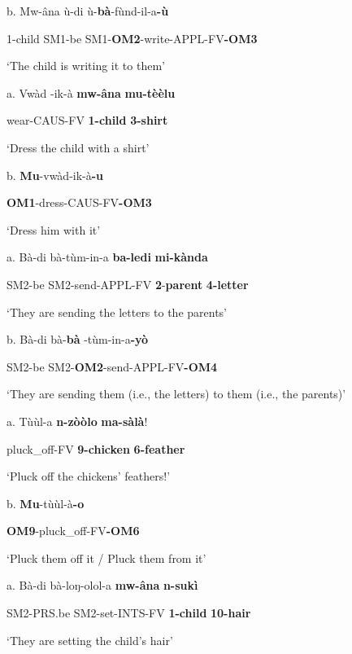 \documentclass[output=paper]{langscibook}
\begin{document}
b.  Mw-âna    ù-di      ù-\textbf{bà}{}-fùnd-il-a\textbf{{}-ù}

1-child    SM1-be    SM1-\textbf{OM2}{}-write-APPL-FV\textbf{{}-OM3}

\glt ‘The child is writing it to them’

\ea%
    \label{ex:lukusa:56}
    \z

          a.  Vwàd  {}-ik-à      \textbf{mw-âna}    \textbf{mu-tèèlu}

      wear-CAUS-FV    \textbf{1-child}    \textbf{3-shirt}

\glt ‘Dress the child with a shirt’

b.  \textbf{Mu}{}-vwàd-ik-à\textbf{{}-u}

\textbf{OM1}{}-dress-CAUS-FV\textbf{{}-OM3}

\glt ‘Dress him with it’

\ea%
    \label{ex:lukusa:57}
    \z

           a.   Bà-di      bà-tùm-in-a      \textbf{ba-ledi}      \textbf{mi-kànda}

      SM2-be    SM2-send-APPL-FV  \textbf{2}{}-\textbf{parent}    \textbf{4-letter}

\glt ‘They are sending the letters to the parents’

b.  Bà-di      bà-\textbf{bà}  {}-tùm-in-a\textbf{{}-yò}

      SM2-be    SM2-\textbf{OM2}{}-send-APPL-FV\textbf{{}-OM4}

\glt ‘They are sending them (i.e., the letters) to them (i.e., the parents)’

\ea%
    \label{ex:lukusa:58}
    \z

          a.   Tùùl-a      \textbf{n-zòòlo}    \textbf{ma-sàlà}!

      pluck\_off-FV  \textbf{9-chicken}  \textbf{6-feather}

\glt ‘Pluck off the chickens’  feathers!’

b.   \textbf{Mu}{}-tùùl-à\textbf{{}-o}

\textbf{OM9}{}-pluck\_off-FV\textbf{{}-OM6}

\glt ‘Pluck them off it / Pluck them from it’

\ea%
    \label{ex:lukusa:59}
    \z

          a.   Bà-di        bà-loŋ-olol-a      \textbf{mw-âna}    \textbf{n-sukì}

      SM2-PRS.be  SM2-set-INTS-FV    \textbf{1-child}    \textbf{10-hair}

\glt ‘They are setting the child’s hair’
\end{document}
